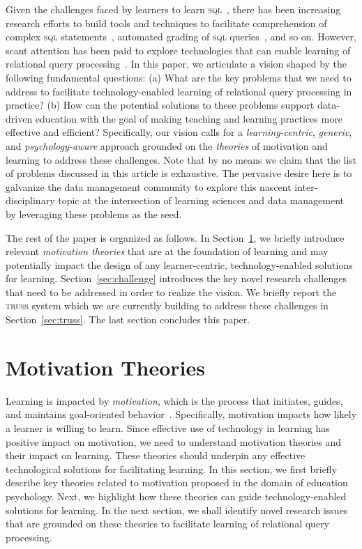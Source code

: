 \documentclass[11pt]{article}
\begin{document}
Given the challenges faced by learners to learn \textsc{sql}~\cite{MAF21}, there has been increasing research efforts to build tools and techniques to facilitate comprehension of complex \textsc{sql} statements~\cite{KV+12,HM+22,MRY19,MF21,LZ+20,DG11}, automated grading of \textsc{sql} queries~\cite{BC+15}, and so on. However, scant attention has been paid to explore technologies that can enable learning of relational query processing~\cite{lantern,neuron,picasso}. In this paper, we articulate a vision shaped by the following fundamental questions: (a) What are the key problems that we need to address to facilitate technology-enabled learning of relational query processing in practice? (b) How can the potential solutions to these problems support data-driven education with the goal of making teaching and learning practices more effective and efficient?  Specifically, our vision calls for a \textit{learning-centric}, \textit{generic}, and \textit{psychology-aware} approach grounded on the \textit{theories} of motivation and learning to address these challenges. Note that by no means we claim that the list of problems discussed in this article is exhaustive. The pervasive desire here is to galvanize the data management community to explore this nascent inter-disciplinary topic at the intersection of learning sciences and data management by leveraging these problems as the seed.

The rest of the paper is organized as follows. In Section~\ref{back}, we briefly introduce relevant \textit{motivation theories} that are at the foundation of learning and may potentially impact the design of any learner-centric, technology-enabled solutions for learning. Section~\ref{sec:challenge} introduces the  key novel research challenges that need to be addressed in order to realize the vision. We briefly report the \textsc{truss} system which we are currently building to address these challenges in Section~\ref{sec:truss}. The last section concludes this paper.
  
\section{Motivation Theories}
\label{back} 

Learning is impacted by \textit{motivation}, which is the process that initiates, guides, and maintains goal-oriented behavior~\cite{kazdin}. Specifically, motivation impacts how likely a learner is willing to learn. Since effective use of technology in learning has positive impact on motivation,  we need to understand motivation theories and their impact on learning. These theories should underpin any effective technological solutions for facilitating learning. In this section, we first briefly describe key theories related to motivation proposed in the domain of education psychology. Next, we highlight how these theories can guide technology-enabled solutions for learning. In the next section, we shall identify novel research issues that are grounded on these theories to facilitate learning of relational query processing.
\end{document}
